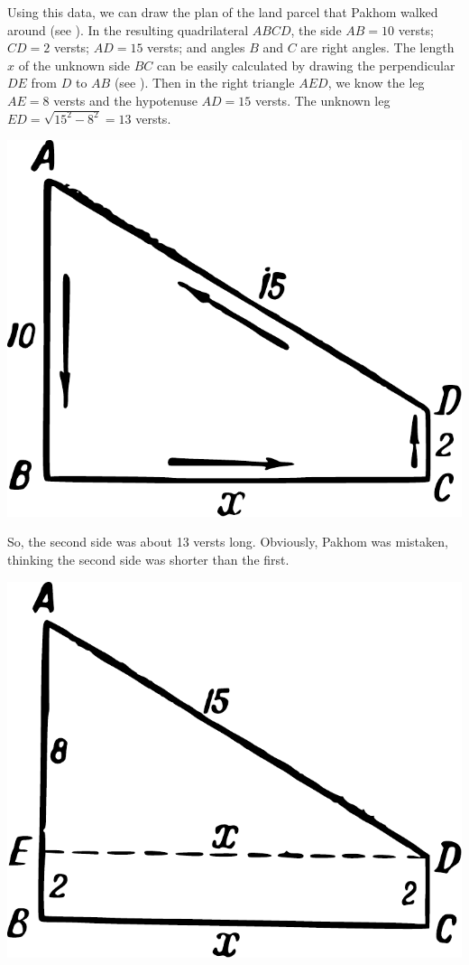 Using this data, we can draw the plan of the land parcel that Pakhom walked around (see ). In the resulting quadrilateral $ABCD$, the side $AB = 10$ versts; $CD = 2$ versts; $AD = 15$ versts; and angles $B$ and $C$ are right angles. The length $x$ of the unknown side $BC$ can be easily calculated by drawing the perpendicular $DE$ from $D$ to $AB$ (see ). Then in the right triangle $AED$, we know the leg $AE = 8$ versts and the hypotenuse $AD = 15$ versts. The unknown leg $ED = \sqrt{15^{2} - 8^{2}} = 13$ versts.
\begin{marginfigure}[-2cm]%
\centering
\includegraphics[width=\textwidth]{figures/ch-12/fig-175.pdf}
\end{marginfigure}


So, the second side was about 13 versts long. Obviously, Pakhom was mistaken, thinking the second side was shorter than the first.

\begin{marginfigure}[1cm]%
\centering
\includegraphics[width=\textwidth]{figures/ch-12/fig-176.pdf}
\end{marginfigure}

